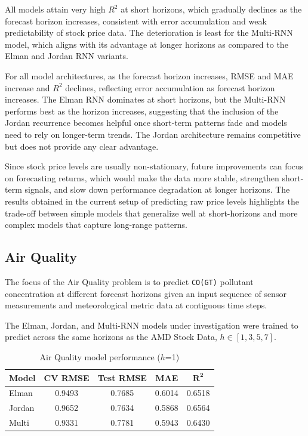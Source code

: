 \documentclass[conference]{IEEEtran}
\begin{document}
All models attain very high $R^2$ at short horizons, which gradually declines as the forecast horizon increases, consistent with error accumulation and weak predictability of stock price data. The deterioration is least for the Multi-RNN model, which aligns with its advantage at longer horizons as compared to the Elman and Jordan RNN variants.

For all model architectures, as the forecast horizon increases, RMSE and MAE increase and $R^2$ declines, reflecting error accumulation as forecast horizon increases. The Elman RNN dominates at short horizons, but the Multi-RNN performs best as the horizon increases, suggesting that the inclusion of the Jordan recurrence becomes helpful once short-term patterns fade and models need to rely on longer-term trends. The Jordan architecture remains competitive but does not provide any clear advantage.

Since stock price levels are usually non-stationary, future improvements can focus on forecasting returns, which would make the data more stable, strengthen short-term signals, and slow down performance degradation at longer horizons. The results obtained in the current setup of predicting raw price levels highlights the trade-off between simple models that generalize well at short-horizons and more complex models that capture long-range patterns.  

\subsection{\textbf{Air Quality}}
The focus of the Air Quality problem is to predict \texttt{CO(GT)} pollutant concentration at different forecast horizons given an input sequence of sensor measurements and meteorological metric data at contiguous time steps.

The Elman, Jordan, and Multi-RNN models under investigation were trained to predict across the same horizons as the AMD Stock Data, $h \in [1,3,5,7]$.

\begin{table}[H]
\centering
\caption{Air Quality model performance ($h$=1)}
\label{tab:aq_h1}
\begin{tabular}{lcccc}
\toprule
\textbf{Model} & \textbf{CV RMSE} & \textbf{Test RMSE} & \textbf{MAE} & \(\mathbf{R^2}\) \\
\midrule
Elman  & 0.9493 & 0.7685 & 0.6014 & 0.6518 \\
Jordan & 0.9652 & 0.7634 & 0.5868 & 0.6564 \\
Multi  & 0.9331 & 0.7781 & 0.5943 & 0.6430 \\
\bottomrule
\end{tabular}
\end{table}
\end{document}
